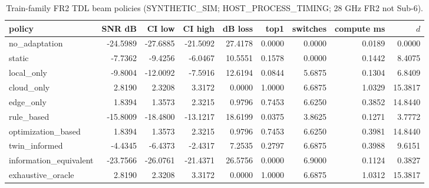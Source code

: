 \begin{table}[h]\centering
\caption{Train-family FR2 TDL beam policies (SYNTHETIC\_SIM; HOST\_PROCESS\_TIMING; 28 GHz FR2 not Sub-6).}
\begin{tabular}{lrrrrrrrr}\toprule
policy & SNR dB & CI low & CI high & dB loss & top1 & switches & compute ms & $d$ \\
\midrule
no\_adaptation & -24.5989 & -27.6885 & -21.5092 & 27.4178 & 0.0000 & 0.0000 & 0.0189 & 0.0000 \\
static & -7.7362 & -9.4256 & -6.0467 & 10.5551 & 0.1578 & 0.0000 & 0.1442 & 8.4075 \\
local\_only & -9.8004 & -12.0092 & -7.5916 & 12.6194 & 0.0844 & 5.6875 & 0.1304 & 6.8409 \\
cloud\_only & 2.8190 & 2.3208 & 3.3172 & 0.0000 & 1.0000 & 6.6875 & 1.0329 & 15.3817 \\
edge\_only & 1.8394 & 1.3573 & 2.3215 & 0.9796 & 0.7453 & 6.6250 & 0.3852 & 14.8440 \\
rule\_based & -15.8009 & -18.4800 & -13.1217 & 18.6199 & 0.0375 & 3.8625 & 0.1271 & 3.7772 \\
optimization\_based & 1.8394 & 1.3573 & 2.3215 & 0.9796 & 0.7453 & 6.6250 & 0.3981 & 14.8440 \\
twin\_informed & -4.4345 & -6.4373 & -2.4317 & 7.2535 & 0.2797 & 6.6875 & 0.3988 & 9.6151 \\
information\_equivalent & -23.7566 & -26.0761 & -21.4371 & 26.5756 & 0.0000 & 6.9000 & 0.1124 & 0.3827 \\
exhaustive\_oracle & 2.8190 & 2.3208 & 3.3172 & 0.0000 & 1.0000 & 6.6875 & 1.0312 & 15.3817 \\
\bottomrule\end{tabular}
\end{table}

